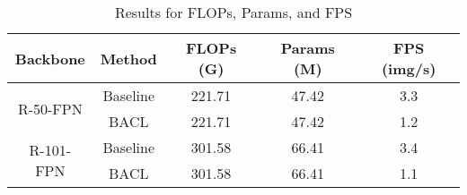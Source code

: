 \documentclass[lettersize,journal]{IEEEtran}
\begin{document}
\begin{table}[!t]
    \renewcommand\arraystretch{0.9}
    \centering
    \caption{Results for FLOPs, Params, and FPS}
    \begin{tabular}{c|c|ccc}
    \toprule
    Backbone & Method & FLOPs (G) & Params (M) & FPS (img/s)           \\
    \midrule
    \multirow{2}{*}{R-50-FPN} & Baseline & 221.71 & 47.42 & 3.3 \\
    & BACL & 221.71 & 47.42 & 1.2 \\
    \midrule
    \multirow{2}{*}{R-101-FPN} & Baseline & 301.58 & 66.41 & 3.4 \\
    & BACL & 301.58 & 66.41 & 1.1 \\
    \bottomrule
    \end{tabular}
    \label{tab:speed}
    \vspace{-4mm}
\end{table}
\end{document}
